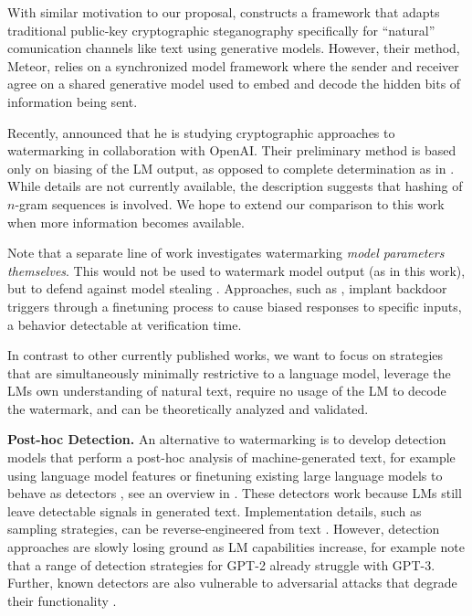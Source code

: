 \documentclass{article}
\theoremstyle{plain}
\theoremstyle{definition}
\theoremstyle{remark}
\begin{document}
With similar motivation to our proposal, \citet{kaptchuk2021meteor} constructs a framework that adapts traditional public-key cryptographic steganography specifically for ``natural'' comunication channels like text using generative models. However, their method, Meteor, relies on a synchronized model framework where the sender and receiver agree on a shared generative model used to embed and decode the hidden bits of information being sent.

Recently, \citet{aaronson_my_2022} announced that he is studying cryptographic approaches to watermarking in collaboration with OpenAI. Their preliminary method is based only on biasing of the LM output, as opposed to complete determination as in \citet{fang_generating_2017}.  While details are not currently available, the description suggests that hashing of $n$-gram sequences is involved. We hope to extend our comparison to this work when more information becomes available.

Note that a separate line of work investigates watermarking \textit{model parameters themselves}. This would not be used to watermark model output (as in this work), but to defend against model stealing \citep{adi_turning_2018,boenisch_systematic_2021}. Approaches, such as \citet{gu_watermarking_2022}, implant backdoor triggers through a finetuning process to cause biased responses to specific inputs, a behavior detectable at verification time.

In contrast to other currently published works, we want to focus on strategies that are simultaneously minimally restrictive to a language model, leverage the LMs own understanding of natural text, require no usage of the LM to decode the watermark, and can be theoretically analyzed and validated.

\textbf{Post-hoc Detection.}
 An alternative to watermarking is to develop detection models that perform a post-hoc analysis of machine-generated text, for example using language model features or finetuning existing large language models to behave as detectors \citep{zellers_defending_2019,tan_detecting_2020}, see an overview in \citet{jawahar_automatic_2020}. These detectors work because LMs still leave detectable signals in generated text. Implementation details, such as sampling strategies, can be reverse-engineered from text \citep{tay_reverse_2020}. However, detection approaches are slowly losing ground as LM capabilities increase, for example \citet{gambini_pushing_2022} note that a range of detection strategies for GPT-2 already struggle with GPT-3. Further, known detectors are also vulnerable to adversarial attacks that degrade their functionality \citep{wolff_attacking_2022}.
\end{document}
